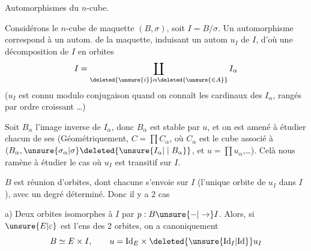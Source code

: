 Automorphismes du $n$-cube.

Considérons le $n$-cube de maquette $(B,\sigma)$, soit $I=B/\sigma$. Un automorphisme correspond à un autom.  de la maquette, induisant un autom $u_I$ de $I$, d'où une décomposition de $I$ en orbites
\[
 I=\coprod_{\deleted{\unsure{i}}\alpha\deleted{\unsure{\in A}}}I_\alpha
\]
($u_I$ est connu modulo conjugaison quand on connaît les cardinaux des $I_\alpha$, rangés par ordre croissant \ldots)

Soit $B_\alpha$ l'image inverse de $I_\alpha$, donc $B_\alpha$ est stable par $u$,    et on est amené à étudier chacun de ses  (Géométriquement, $C=\prod C_\alpha$, où $C_\alpha$ est le cube associé à $(B_\alpha,\unsure{\sigma_\alpha|\sigma}\deleted{\unsure{I_\alpha|\mid B_\alpha}}$, et $u=\prod u_\alpha$,\ldots). Celà nous ramène à étudier le cas où $u_I$ est transitif sur $I$.

$B$ est réunion d'orbites, dont chacune s'envoie sur $I$ (l'unique orbite  de $u_I$ dans $I$), avec un degré déterminé. Donc il y a 2 cas

a) Deux orbites isomorphes à $I$  par $p:B\unsure{-|\to} I$. Alors, si  $\unsure{E|\varepsilon}$ est l'ens des 2 orbites, on a canoniquement
\[
 B\simeq E\times I,\qquad u=\mathrm{Id}_E\times\deleted{\unsure{\mathrm{Id}_I|\mathrm{Id}}}u_I
\]
